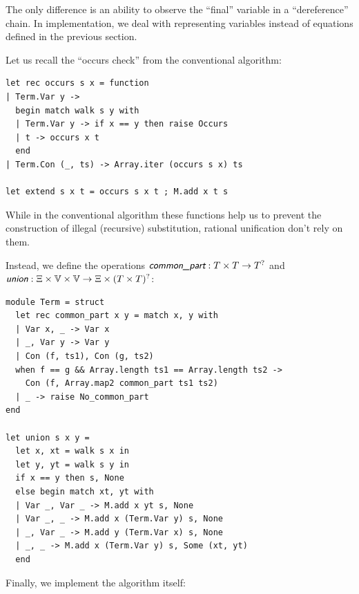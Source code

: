 The only difference is an ability to observe the ``final'' variable in a ``dereference'' chain. In implementation, we deal with representing variables instead of equations defined in the previous section.
\pagebreak

Let us recall the ``occurs check'' from the conventional algorithm:

\begin{verbatim}
let rec occurs s x = function
| Term.Var y ->
  begin match walk s y with
  | Term.Var y -> if x == y then raise Occurs
  | t -> occurs x t
  end
| Term.Con (_, ts) -> Array.iter (occurs s x) ts

let extend s x t = occurs s x t ; M.add x t s
\end{verbatim}
\vspace{\baselineskip}

While in the conventional algorithm these functions help us to prevent the construction of illegal (recursive) substitution, rational unification don't rely on them.

Instead, we define the operations $\commonpart : T \times T \rightarrow T^?$ and $\union : \Xi \times \V \times \V \rightarrow \Xi \times (T \times T)^?$:

\begin{verbatim}
module Term = struct
  let rec common_part x y = match x, y with
  | Var x, _ -> Var x
  | _, Var y -> Var y
  | Con (f, ts1), Con (g, ts2)
  when f == g && Array.length ts1 == Array.length ts2 ->
    Con (f, Array.map2 common_part ts1 ts2)
  | _ -> raise No_common_part
end

let union s x y =
  let x, xt = walk s x in
  let y, yt = walk s y in
  if x == y then s, None
  else begin match xt, yt with
  | Var _, Var _ -> M.add x yt s, None
  | Var _, _ -> M.add x (Term.Var y) s, None
  | _, Var _ -> M.add y (Term.Var x) s, None
  | _, _ -> M.add x (Term.Var y) s, Some (xt, yt)
  end
\end{verbatim}
\vspace{\baselineskip}

Finally, we implement the algorithm itself:

